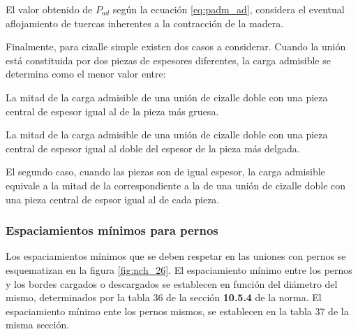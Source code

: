 El valor obtenido de $P_{ad}$ según la ecuación \ref{eq:padm_ad}, considera el eventual aflojamiento de tuercas inherentes a la contracción de la madera.

Finalmente, para cizalle simple existen dos casos a considerar. Cuando la unión está constituida por dos piezas de espesores diferentes, la carga admisible se determina como el menor valor entre:
\begin{itemize*}
	\item La mitad de la carga admisible de una unión de cizalle doble con una pieza central de espesor igual al de la pieza más gruesa.
	\item La mitad de la carga admisible de una unión de cizalle doble con una pieza central de espesor igual al doble del espesor de la pieza más delgada.
\end{itemize*}
El segundo caso, cuando las piezas son de igual espesor, la carga admisible equivale a la mitad de la correspondiente a la de una unión de cizalle doble con una pieza central de espsor igual al de cada pieza.

\subsubsection{Espaciamientos mínimos para pernos}
\label{sec:espaciamiento_pernos}
Los espaciamientos mínimos que se deben respetar en las uniones con pernos se esquematizan en la figura \ref{fig:nch_26}. El espaciamiento mínimo entre los pernos y los bordes cargados o descargados se establecen en función del diámetro del mismo, determinados por la tabla 36 de la sección \textbf{10.5.4} de la norma. El espaciamiento mínimo ente los pernos mismos, se establecen en la tabla 37 de la misma sección. 

